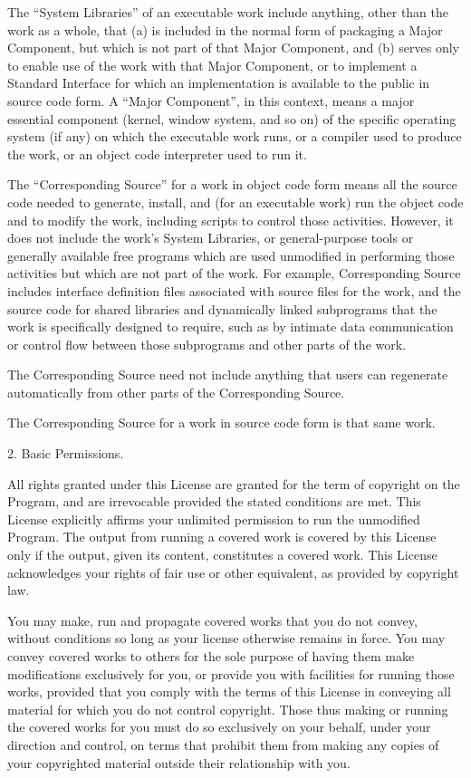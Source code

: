   The ``System Libraries'' of an executable work include anything, other
than the work as a whole, that (a) is included in the normal form of
packaging a Major Component, but which is not part of that Major
Component, and (b) serves only to enable use of the work with that
Major Component, or to implement a Standard Interface for which an
implementation is available to the public in source code form.  A
``Major Component'', in this context, means a major essential component
(kernel, window system, and so on) of the specific operating system
(if any) on which the executable work runs, or a compiler used to
produce the work, or an object code interpreter used to run it.

  The ``Corresponding Source'' for a work in object code form means all
the source code needed to generate, install, and (for an executable
work) run the object code and to modify the work, including scripts to
control those activities.  However, it does not include the work's
System Libraries, or general-purpose tools or generally available free
programs which are used unmodified in performing those activities but
which are not part of the work.  For example, Corresponding Source
includes interface definition files associated with source files for
the work, and the source code for shared libraries and dynamically
linked subprograms that the work is specifically designed to require,
such as by intimate data communication or control flow between those
subprograms and other parts of the work.

  The Corresponding Source need not include anything that users
can regenerate automatically from other parts of the Corresponding
Source.

  The Corresponding Source for a work in source code form is that
same work.

  2. Basic Permissions.

  All rights granted under this License are granted for the term of
copyright on the Program, and are irrevocable provided the stated
conditions are met.  This License explicitly affirms your unlimited
permission to run the unmodified Program.  The output from running a
covered work is covered by this License only if the output, given its
content, constitutes a covered work.  This License acknowledges your
rights of fair use or other equivalent, as provided by copyright law.

  You may make, run and propagate covered works that you do not
convey, without conditions so long as your license otherwise remains
in force.  You may convey covered works to others for the sole purpose
of having them make modifications exclusively for you, or provide you
with facilities for running those works, provided that you comply with
the terms of this License in conveying all material for which you do
not control copyright.  Those thus making or running the covered works
for you must do so exclusively on your behalf, under your direction
and control, on terms that prohibit them from making any copies of
your copyrighted material outside their relationship with you.


